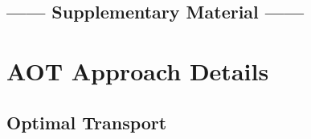 
\begin{center}
    \section*{------ Supplementary Material ------}
\end{center}

\begin{abstract}
This supplementary material provides additional details and analysis to support the main paper, as follows:
\begin{itemize}
    \item In Sec.~\ref{sec:ot_analysis}, we provide with more detailed theoretical analysis in terms of optimal transport.
    \item In Sec.~\ref{sec:more_imples}, we describe more detailed implementations.
    \item In Sec.~\ref{sec:dynamic_clip}, we conduct more experiments on dynamic frame clip setting to demonstrate the practical advantage of our proposed AOT.
    \item In Sec.~\ref{sec:random}, we conduct more ablation study by randomly selecting the token anchors within intra-frame level to illustrate the importance of high-quality token anchors establishment.
    \item In Sec.~\ref{sec:visualization}, we provide with more visualizations in terms of our initial token anchors.
    \item In Sec.~\ref{sec:limit_future}, we support with the limitation of our method and future improvements.
\end{itemize}

\end{abstract}



\section{AOT Approach Details}
\label{sec:ot_analysis}

\subsection{Optimal Transport}

